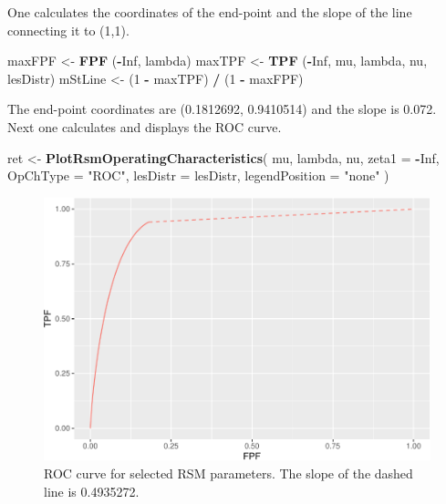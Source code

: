 \documentclass[
]{book}
\newenvironment{Shaded}{\begin{snugshade}}{\end{snugshade}}
\newcommand{\DataTypeTok}[1]{\textcolor[rgb]{0.13,0.29,0.53}{#1}}
\newcommand{\DecValTok}[1]{\textcolor[rgb]{0.00,0.00,0.81}{#1}}
\newcommand{\KeywordTok}[1]{\textcolor[rgb]{0.13,0.29,0.53}{\textbf{#1}}}
\newcommand{\NormalTok}[1]{#1}
\newcommand{\OperatorTok}[1]{\textcolor[rgb]{0.81,0.36,0.00}{\textbf{#1}}}
\newcommand{\OtherTok}[1]{\textcolor[rgb]{0.56,0.35,0.01}{#1}}
\newcommand{\StringTok}[1]{\textcolor[rgb]{0.31,0.60,0.02}{#1}}
\begin{document}
One calculates the coordinates of the end-point and the slope of the line connecting it to (1,1).

\begin{Shaded}
\begin{Highlighting}[]
\NormalTok{maxFPF <-}\StringTok{ }\KeywordTok{FPF}\NormalTok{ (}\OperatorTok{-}\OtherTok{Inf}\NormalTok{, lambda)}
\NormalTok{maxTPF <-}\StringTok{ }\KeywordTok{TPF}\NormalTok{ (}\OperatorTok{-}\OtherTok{Inf}\NormalTok{, mu, lambda, nu, lesDistr)}
\NormalTok{mStLine <-}\StringTok{ }\NormalTok{(}\DecValTok{1} \OperatorTok{-}\StringTok{ }\NormalTok{maxTPF) }\OperatorTok{/}\StringTok{ }\NormalTok{(}\DecValTok{1} \OperatorTok{-}\StringTok{ }\NormalTok{maxFPF)}
\end{Highlighting}
\end{Shaded}

The end-point coordinates are (0.1812692, 0.9410514) and the slope is 0.072. Next one calculates and displays the ROC curve.

\begin{Shaded}
\begin{Highlighting}[]
\NormalTok{ret <-}\StringTok{ }\KeywordTok{PlotRsmOperatingCharacteristics}\NormalTok{(}
\NormalTok{  mu,}
\NormalTok{  lambda,}
\NormalTok{  nu,}
  \DataTypeTok{zeta1 =} \OperatorTok{-}\OtherTok{Inf}\NormalTok{, }
  \DataTypeTok{OpChType =} \StringTok{"ROC"}\NormalTok{,}
  \DataTypeTok{lesDistr =}\NormalTok{ lesDistr,}
  \DataTypeTok{legendPosition =} \StringTok{"none"}
\NormalTok{)}
\end{Highlighting}
\end{Shaded}

\begin{figure}
\centering
\includegraphics{07-rsm-predictions_files/figure-latex/rsm-predictions-roc-plot-1.pdf}
\caption{\label{fig:rsm-predictions-roc-plot}ROC curve for selected RSM parameters. The slope of the dashed line is 0.4935272.}
\end{figure}
\end{document}
